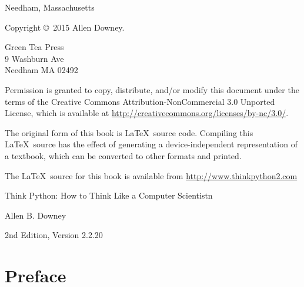 \documentclass[10pt]{book}
\newcommand{\thetitle}{Think Python: How to Think Like a Computer Scientistn}
\newcommand{\theversion}{2nd Edition, Version 2.2.20}
\newcommand{\thedate}{}
\begin{document}
\begin{latexonly}
\begin{flushright}
{\small Needham, Massachusetts}

\vfill

\end{flushright}


\pagebreak
\thispagestyle{empty}

{\small
Copyright \copyright ~2015 Allen Downey.


\vspace{0.2in}

\begin{flushleft}
Green Tea Press       \\
9 Washburn Ave        \\
Needham MA 02492
\end{flushleft}

Permission is granted to copy, distribute, and/or modify this document
under the terms of the Creative Commons Attribution-NonCommercial 3.0 Unported
License, which is available at \url{http://creativecommons.org/licenses/by-nc/3.0/}.

The original form of this book is \LaTeX\ source code.  Compiling this
\LaTeX\ source has the effect of generating a device-independent
representation of a textbook, which can be converted to other formats
and printed.

The \LaTeX\ source for this book is available from
\url{http://www.thinkpython2.com}

\vspace{0.2in}

} %

\end{latexonly}



\begin{htmlonly}


{\Large \thetitle}

{\large Allen B. Downey}

\theversion

\thedate

\setcounter{chapter}{-1}

\end{htmlonly}

\fi


\chapter{Preface}
\end{document}
